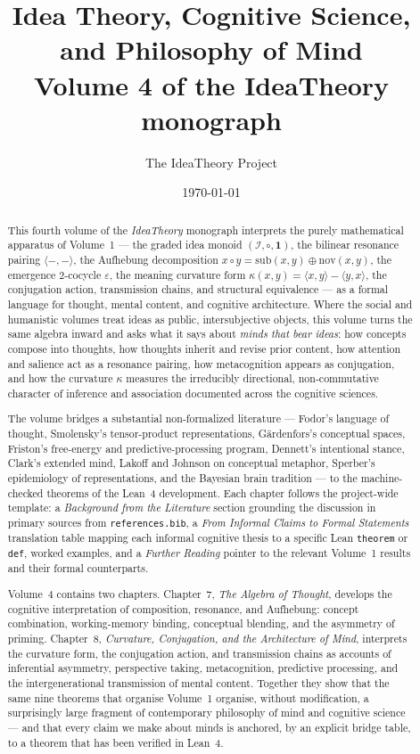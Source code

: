 \documentclass[11pt,oneside]{book}
\title{Idea Theory, Cognitive Science, and Philosophy of Mind\\
\large Volume 4 of the IdeaTheory monograph}
\author{The IdeaTheory Project}
\date{\today}
\begin{document}
\maketitle

\begin{abstract}
This fourth volume of the \emph{IdeaTheory} monograph interprets the
purely mathematical apparatus of Volume~1 --- the graded idea monoid
$(\mathcal{I},\circ,\mathbf{1})$, the bilinear resonance pairing
$\langle{-},{-}\rangle$, the Aufhebung decomposition
$x\circ y = \mathrm{sub}(x,y)\oplus \mathrm{nov}(x,y)$, the emergence
$2$-cocycle $\varepsilon$, the meaning curvature form
$\kappa(x,y)=\langle x,y\rangle-\langle y,x\rangle$, the conjugation
action, transmission chains, and structural equivalence --- as a
formal language for thought, mental content, and cognitive
architecture.  Where the social and humanistic volumes treat ideas as
public, intersubjective objects, this volume turns the same algebra
inward and asks what it says about \emph{minds that bear ideas}: how
concepts compose into thoughts, how thoughts inherit and revise prior
content, how attention and salience act as a resonance pairing, how
metacognition appears as conjugation, and how the curvature
$\kappa$ measures the irreducibly directional, non-commutative
character of inference and association documented across the cognitive
sciences.

The volume bridges a substantial non-formalized literature ---
Fodor's language of thought, Smolensky's tensor-product
representations, G\"ardenfors's conceptual spaces, Friston's
free-energy and predictive-processing program, Dennett's
intentional stance, Clark's extended mind, Lakoff and Johnson on
conceptual metaphor, Sperber's epidemiology of representations, and
the Bayesian brain tradition --- to the machine-checked theorems of
the Lean~4 development.  Each chapter follows the project-wide
template: a \emph{Background from the Literature} section grounding
the discussion in primary sources from \texttt{references.bib}, a
\emph{From Informal Claims to Formal Statements} translation table
mapping each informal cognitive thesis to a specific Lean
\texttt{theorem} or \texttt{def}, worked examples, and a
\emph{Further Reading} pointer to the relevant Volume~1 results and
their formal counterparts.

Volume~4 contains two chapters.  Chapter~7, \emph{The Algebra of
Thought}, develops the cognitive interpretation of composition,
resonance, and Aufhebung: concept combination, working-memory
binding, conceptual blending, and the asymmetry of priming.
Chapter~8, \emph{Curvature, Conjugation, and the Architecture of
Mind}, interprets the curvature form, the conjugation action, and
transmission chains as accounts of inferential asymmetry, perspective
taking, metacognition, predictive processing, and the
intergenerational transmission of mental content.  Together they
show that the same nine theorems that organise Volume~1 organise,
without modification, a surprisingly large fragment of contemporary
philosophy of mind and cognitive science --- and that every claim we
make about minds is anchored, by an explicit bridge table, to a
theorem that has been verified in Lean~4.
\end{abstract}
\end{document}

